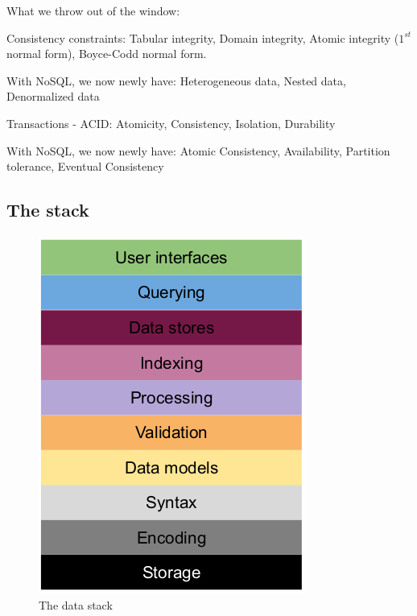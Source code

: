 \documentclass[11pt,oneside,a4paper]{article}
\begin{document}
What we throw out of the window:

\begin{compactitem}
	\item Consistency constraints: Tabular integrity, Domain integrity, Atomic integrity ($1^{st}$ normal form), Boyce-Codd normal form.
	\begin{compactitem}
		\item With NoSQL, we now newly have: Heterogeneous data, Nested data, Denormalized data
	\end{compactitem}
	\item Transactions - ACID: Atomicity, Consistency, Isolation, Durability
	\begin{compactitem}
	\item With NoSQL, we now newly have: Atomic Consistency, Availability, Partition tolerance, Eventual Consistency
	\end{compactitem}
\end{compactitem}

\subsection{The stack}

\begin{figure}
	\centering
	\includegraphics[width=0.2\linewidth]{figures/data_stack}
	\caption{The data stack}
	\label{fig:datastack}
\end{figure}
\end{document}

